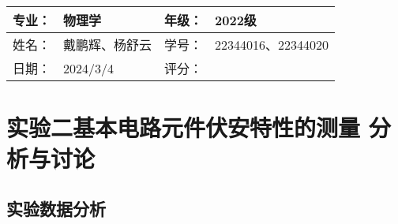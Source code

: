 \documentclass[dvipsnames, svgnames,a4paper,11pt]{article}
\begin{document}
	
	
	\clearpage
	
	\begin{table}
		\renewcommand\arraystretch{1.7}
		\begin{tabularx}{\textwidth}{|X|X|X|X|}
			\hline
			专业：& 物理学 &年级：& 2022级\\
			\hline
			姓名： & 戴鹏辉、杨舒云 & 学号：& 22344016、22344020\\
			\hline
			日期：& 2024/3/4 & 评分： &\\
			\hline
		\end{tabularx}
	\end{table}
	
	\section{实验二\quad 基本电路元件伏安特性的测量 \quad\heiti 分析与讨论}
	
	\subsection{实验数据分析}
	
\end{document}

